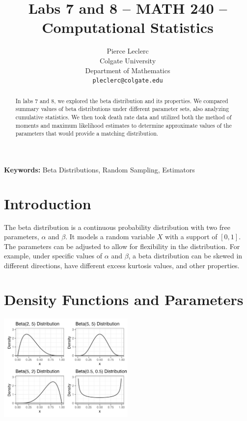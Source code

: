\documentclass{article}\usepackage[]{graphicx}\usepackage[]{xcolor}
\newenvironment{Figure}
  {\par\medskip\noindent\minipage{\linewidth}}
  {\endminipage\par\medskip}
\begin{document}
\vspace{-1in}
\title{Labs 7 and 8 -- MATH 240 -- Computational Statistics}

\author{
  Pierce Leclerc \\
  Colgate University  \\
  Department of Mathematics  \\
  {\tt pleclerc@colgate.edu}
}

\date{}

\maketitle

\begin{multicols}{2}
\begin{abstract}
In labs 7 and 8, we explored the beta distribution and its properties. We compared summary values of beta distributions under different parameter sets, also analyzing cumulative statistics. We then took death rate data and utilized both the method of moments and maximum likelihood estimates to determine approximate values of the parameters that would provide a matching distribution.
\end{abstract}

\noindent \textbf{Keywords:} Beta Distributions, Random Sampling, Estimators 

\section{Introduction}
The beta distribution is a continuous probability distribution with two free parameters, $\alpha$ and $\beta$. It models a random variable $X$ with a support of $[0,1]$. The parameters can be adjusted to allow for flexibility in the distribution. For example, under specific values of $\alpha$ and $\beta$, a beta distribution can be skewed in different directions, have different excess kurtosis values, and other properties.

\section{Density Functions and Parameters}

\begin{Figure}
\begin{center}
  \includegraphics[width=0.5\textwidth]{task1.png}
\end{center}
\end{Figure}


\end{multicols}
\end{document}
